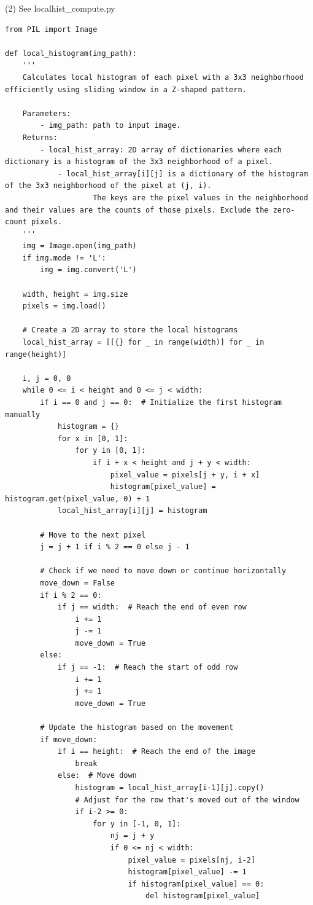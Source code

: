 \documentclass[UTF8]{ctexart}
\begin{document}
\newpage
(2) See localhist\_compute.py
\begin{lstlisting}
from PIL import Image

def local_histogram(img_path):
    '''
    Calculates local histogram of each pixel with a 3x3 neighborhood efficiently using sliding window in a Z-shaped pattern.

    Parameters:
        - img_path: path to input image.
    Returns:
        - local_hist_array: 2D array of dictionaries where each dictionary is a histogram of the 3x3 neighborhood of a pixel.
            - local_hist_array[i][j] is a dictionary of the histogram of the 3x3 neighborhood of the pixel at (j, i).
                    The keys are the pixel values in the neighborhood and their values are the counts of those pixels. Exclude the zero-count pixels.
    '''
    img = Image.open(img_path)
    if img.mode != 'L':
        img = img.convert('L')

    width, height = img.size
    pixels = img.load()

    # Create a 2D array to store the local histograms
    local_hist_array = [[{} for _ in range(width)] for _ in range(height)]

    i, j = 0, 0
    while 0 <= i < height and 0 <= j < width:
        if i == 0 and j == 0:  # Initialize the first histogram manually
            histogram = {}
            for x in [0, 1]:
                for y in [0, 1]:
                    if i + x < height and j + y < width:
                        pixel_value = pixels[j + y, i + x]
                        histogram[pixel_value] = histogram.get(pixel_value, 0) + 1
            local_hist_array[i][j] = histogram

        # Move to the next pixel
        j = j + 1 if i % 2 == 0 else j - 1
        
        # Check if we need to move down or continue horizontally
        move_down = False
        if i % 2 == 0:
            if j == width:  # Reach the end of even row
                i += 1
                j -= 1
                move_down = True
        else:
            if j == -1:  # Reach the start of odd row
                i += 1
                j += 1
                move_down = True
                
        # Update the histogram based on the movement
        if move_down:
            if i == height:  # Reach the end of the image
                break
            else:  # Move down
                histogram = local_hist_array[i-1][j].copy()
                # Adjust for the row that's moved out of the window
                if i-2 >= 0:
                    for y in [-1, 0, 1]:
                        nj = j + y
                        if 0 <= nj < width:
                            pixel_value = pixels[nj, i-2]
                            histogram[pixel_value] -= 1
                            if histogram[pixel_value] == 0:
                                del histogram[pixel_value]


\end{lstlisting}
\end{document}
